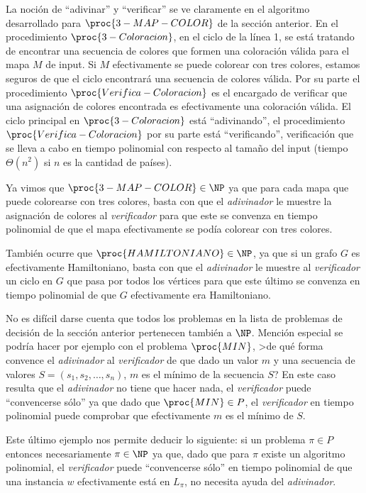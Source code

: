 La noción de ``adivinar'' y ``verificar'' se ve claramente en el algoritmo desarrollado para $\proc{3-MAP-COLOR}$ de la sección anterior.
En el procedimiento $\proc{3-Coloracion}$, en el ciclo de la línea 1, se está tratando de encontrar una secuencia de colores que formen una coloración válida para el mapa $M$ de input. 
Si $M$ efectivamente se puede colorear con tres colores, estamos seguros de que el ciclo encontrará una secuencia de colores válida.
Por su parte el procedimiento $\proc{Verifica-Coloracion}$ es el encargado de verificar que una asignación de colores encontrada es efectivamente una coloración válida.
El ciclo principal en $\proc{3-Coloracion}$ está ``adivinando'', el procedimiento $\proc{Verifica-Coloracion}$ por su parte está ``verificando'', verificación que se lleva a cabo en tiempo polinomial con respecto al tamaño del input (tiempo $\Theta(n^2)$ si $n$ es la cantidad de países).

\begin{ejemplo}
Ya vimos que $\proc{3-MAP-COLOR}\in\NP$ ya que para cada mapa que puede colorearse con tres colores, basta con que el \emph{adivinador} le muestre la asignación de colores al \emph{verificador} para que este se convenza en tiempo polinomial de que el mapa efectivamente se podía colorear con tres colores.

También ocurre que $\proc{HAMILTONIANO}\in\NP$, ya que si un grafo $G$ es efectivamente Hamiltoniano, basta con que el \emph{adivinador} le muestre al \emph{verificador} un ciclo en $G$ que pasa por todos los vértices para que este último se convenza en tiempo polinomial de que $G$ efectivamente era Hamiltoniano.

No es difícil darse cuenta que todos los problemas en la lista de problemas de decisión de la sección anterior pertenecen también a $\NP$.
Mención especial se podría hacer por ejemplo con el problema $\proc{MIN}$, >de qué forma convence el \emph{adivinador} al \emph{verificador} de que dado un valor $m$ y una secuencia de valores $S=(s_1,s_2,\ldots,s_n)$, $m$ es el mínimo de la secuencia $S$?
En este caso resulta que el \emph{adivinador} no tiene que hacer nada, el \emph{verificador} puede ``convencerse sólo'' ya que dado que $\proc{MIN}\in P$, el \emph{verificador} en tiempo polinomial puede comprobar que efectivamente $m$ es el mínimo de $S$.
\end{ejemplo}

Este último ejemplo nos permite deducir lo siguiente: si un problema $\pi\in P$ entonces necesariamente $\pi\in\NP$ ya que, dado que para $\pi$ existe un algoritmo polinomial, el \emph{verificador} puede ``convencerse sólo'' en tiempo polinomial de que una instancia $w$ efectivamente está en $L_\pi$, no necesita ayuda del \emph{adivinador}.

